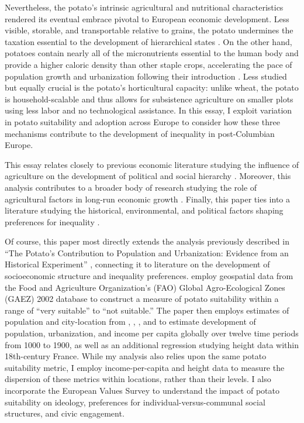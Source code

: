 \documentclass[11pt]{article}
\begin{document}
Nevertheless, the potato's intrinsic agricultural and nutritional characteristics rendered its eventual embrace pivotal to European economic development. Less visible, storable, and transportable relative to grains, the potato undermines the taxation essential to the development of hierarchical states \citep{MaysharMoavPascali2022}. On the other hand, potatoes contain nearly all of the micronutrients essential to the human body and provide a higher caloric density than other staple crops, accelerating the pace of population growth and urbanization following their introduction \citep{NunnQian2011}. Less studied but equally crucial is the potato's horticultural capacity: unlike wheat, the potato is household-scalable and thus allows for subsistence agriculture on smaller plots using less labor and no technological assistance. In this essay, I exploit variation in potato suitability and adoption across Europe to consider how these three mechanisms contribute to the development of inequality in post-Columbian Europe.

This essay relates closely to previous economic literature studying the influence of agriculture on the development of political and social hierarchy \citep{MaysharMoavPascali2022,AlesinaGiulianoNunn2013}. Moreover, this analysis contributes to a broader body of research studying the role of agricultural factors in long-run economic growth \citep{Matranga2024,EngermanSokoloff1997,EngermanSokoloff2000,Easterly2007}. Finally, this paper ties into a literature studying the historical, environmental, and political factors shaping preferences for inequality \citep{AlesinaGiuliano2011,AlesinaAngeletos2005,Bergeron2024}.

Of course, this paper most directly extends the analysis previously described in ``The Potato's Contribution to Population and Urbanization: Evidence from an Historical Experiment'' \citep{NunnQian2011}, connecting it to literature on the development of socioeconomic structure and inequality preferences. \citet{NunnQian2011} employ geospatial data from the Food and Agriculture Organization's (FAO) Global Agro-Ecological Zones (GAEZ) 2002 database to construct a measure of potato suitability within a range of ``very suitable'' to ``not suitable.'' The paper then employs estimates of population and city-location from \citet{McEvedyJones1978}, \citet{Chandler1987}, \citet{Bairoch1988}, and \citet{Modelski2003} to estimate development of population, urbanization, and income per capita globally over twelve time periods from 1000 to 1900, as well as an additional regression studying height data within 18th-century France. While my analysis also relies upon the same potato suitability metric, I employ income-per-capita and height data to measure the dispersion of these metrics within locations, rather than their levels. I also incorporate the European Values Survey to understand the impact of potato suitability on ideology, preferences for individual-versus-communal social structures, and civic engagement.
\end{document}
